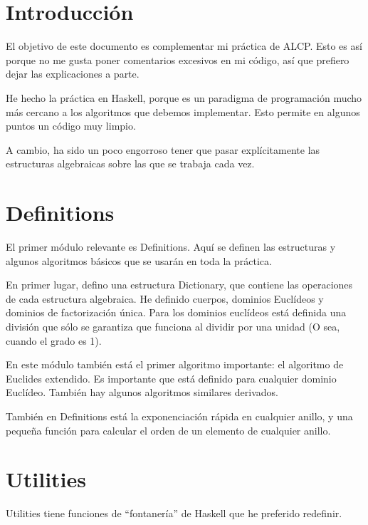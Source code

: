 \documentclass[12pt, a5paper]{article}
\theoremstyle{definition}
\begin{document}

\tableofcontents
\newpage
%
\section{Introducción}
El objetivo de este documento es complementar mi práctica de ALCP.
Esto es así porque no me gusta poner comentarios excesivos en mi
código, así que prefiero dejar las explicaciones a parte.

He hecho la práctica en Haskell, porque es un paradigma de
programación mucho más cercano a los algoritmos que debemos
implementar. Esto permite en algunos puntos un código muy limpio.

A cambio, ha sido un poco engorroso tener que pasar
explícitamente las estructuras algebraicas sobre las que se trabaja
cada vez.

\newpage

\section{Definitions}
El primer módulo relevante es Definitions. Aquí se definen las
estructuras y algunos algoritmos básicos que se usarán en toda la
práctica.

En primer lugar, defino una estructura Dictionary, que contiene las
operaciones de cada estructura algebraica. He definido cuerpos,
dominios Euclídeos y dominios de factorización única. Para los
dominios euclídeos está definida una división que sólo se garantiza
que funciona al dividir por una unidad (O sea, cuando el grado es 1).

En este módulo también está el primer algoritmo importante: el
algoritmo de Euclides extendido. Es importante que está definido para
cualquier dominio Euclídeo. También hay algunos algoritmos similares
derivados.

También en Definitions está la exponenciación rápida en cualquier
anillo, y una pequeña función para calcular el orden de un elemento de
cualquier anillo.
\newpage\newpage

\section{Utilities}
Utilities tiene funciones de ``fontanería'' de Haskell que he
preferido redefinir.
\end{document}
